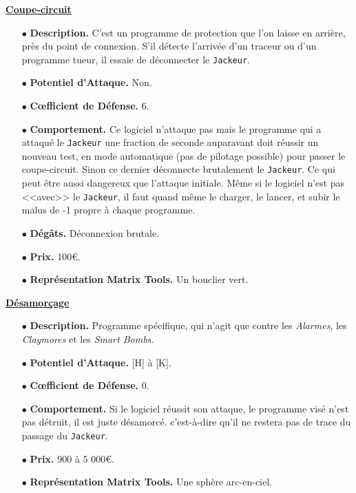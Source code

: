 \documentclass[11pt,twoside,a4paper]{article}
\begin{document}
\begin{multicols*}{2}
\underline{\textbf{Coupe-circuit}} %
\begin{itemize}
	\item[$\bullet$] \textbf{Description. }C'est un programme de protection que l'on laisse en arri{\`e}re, pr{\`e}s du point de connexion. S'il d{\'e}tecte l'arriv{\'e}e d'un traceur ou d'un programme tueur, il essaie de d{\'e}connecter le \texttt{Jackeur}. 
	\item[$\bullet$] \textbf{Potentiel d'Attaque. }Non. 
	\item[$\bullet$] \textbf{C\oe fficient de D{\'e}fense. }6.  
	\item[$\bullet$] \textbf{Comportement. }Ce logiciel n'attaque pas mais le programme qui a attaqu{\'e} le \texttt{Jackeur} une fraction de seconde auparavant doit r{\'e}ussir un nouveau test, en mode automatique (pas de pilotage possible) pour passer le coupe-circuit. Sinon ce dernier d{\'e}connecte brutalement le \texttt{Jackeur}. Ce qui peut {\^e}tre aussi dangereux que l'attaque initiale. M{\^e}me si le logiciel n'est pas <<avec>> le \texttt{Jackeur}, il faut quand m{\^e}me le charger, le lancer, et subir le malus de -1 propre {\`a} chaque programme. 
	\item[$\bullet$] \textbf{D{\'e}g{\^a}ts. }D{\'e}connexion brutale. 
	\item[$\bullet$] \textbf{Prix. }100\euro . 
	\item[$\bullet$] \textbf{Repr{\'e}sentation Matrix Tools. }Un bouclier vert. 
\end{itemize} %

\underline{\textbf{D{\'e}samor\c{c}age}} %
\begin{itemize}
	\item[$\bullet$] \textbf{Description. }Programme sp{\'e}cifique, qui n'agit que contre les \emph{Alarmes}, les \emph{Claymores} et les \emph{Smart Bombs}. 
	\item[$\bullet$] \textbf{Potentiel d'Attaque. }[H] {\`a} [K]. 
	\item[$\bullet$] \textbf{C\oe fficient de D{\'e}fense. }0. 
	\item[$\bullet$] \textbf{Comportement. }Si le logiciel r{\'e}ussit son attaque, le programme vis{\'e} n'est pas d{\'e}truit, il est juste d{\'e}samorc{\'e}. c'est-{\`a}-dire qu'il ne restera pas de trace du passage du \texttt{Jackeur}. 
	\item[$\bullet$] \textbf{Prix. }900 {\`a} 5 000\euro . 
	\item[$\bullet$] \textbf{Repr{\'e}sentation Matrix Tools. }Une sph{\`e}re arc-en-ciel. 
\end{itemize} %


\end{multicols*}
\end{document}
